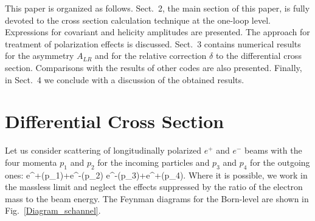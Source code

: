 \documentclass[%
 reprint,
amsmath,
amssymb,
 aps,
 prb,
 floatfix,
]{revtex4-1}
\begin{document}
This paper is organized as follows.
Sect.~2, the main section of this paper, is fully devoted to 	
the cross section calculation technique at the one-loop level.
Expressions for covariant and helicity amplitudes are presented.
The approach for treatment of polarization effects is discussed.
Sect.~3 contains numerical results for the asymmetry $A_{LR}$ 
and for the relative correction $\delta$ to the differential cross section.
Comparisons with the results of other codes are also presented.
Finally, in Sect.~4 we conclude with a discussion of 
the obtained results.

\section{Differential Cross Section}

Let us consider scattering of longitudinally polarized $e^+$ and $e^-$ beams 
with the four momenta $p_1$ and $p_2$ for the incoming particles
and $p_3$ and $p_4$ for the outgoing ones: 
\bqa
e^+(p_1)+e^-(p_2) \longrightarrow e^-(p_3)+e^+(p_4).
\label{bornR}
\eqa
Where it is possible, we work in the massless limit and neglect
the effects suppressed by the ratio of the electron mass to the
beam energy. The Feynman diagrams for the Born-level
are shown in Fig.~\ref{Diagram_schannel}.
\end{document}
